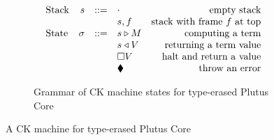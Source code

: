 \documentclass[../plutus-core-specification.tex]{subfiles}
\begin{document}
\begin{figure}[H]
\begin{subfigure}[c]{\linewidth}
    \centering
    \[\begin{array}{lrclr}
        \textrm{Stack} & s      & ::= & \cdot          & \textrm{empty stack}\\
                       &        &     & s,f            & \textrm{stack with frame $f$ at top}\\
        \textrm{State} & \sigma & ::= & s \triangleright M   & \textrm{computing a term}\\
                       &        &     & s \triangleleft V    & \textrm{returning a term value}\\
                       &        &     & \square V      & \textrm{halt and return a value}\\
                       &        &     & \blacklozenge{}     & \textrm{throw an error}
    \end{array}\]

    \caption{Grammar of CK machine states for type-erased Plutus Core}
    \label{fig:untyped-ck-frames}
\end{subfigure}
\caption{A CK machine for type-erased Plutus Core}
\end{figure}
\end{document}
